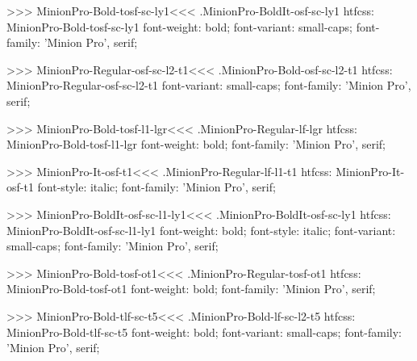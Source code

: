 {>>>
\<MinionPro-Bold-tosf-sc-ly1\><<<
.MinionPro-BoldIt-osf-sc-ly1
htfcss:  MinionPro-Bold-tosf-sc-ly1  font-weight: bold; font-variant: small-caps; font-family: 'Minion Pro', serif;

>>>
\<MinionPro-Regular-osf-sc-l2-t1\><<<
.MinionPro-Bold-osf-sc-l2-t1
htfcss:  MinionPro-Regular-osf-sc-l2-t1  font-variant: small-caps; font-family: 'Minion Pro', serif;

>>>
\<MinionPro-Bold-tosf-l1-lgr\><<<
.MinionPro-Regular-lf-lgr
htfcss:  MinionPro-Bold-tosf-l1-lgr  font-weight: bold; font-family: 'Minion Pro', serif;

>>>
\<MinionPro-It-osf-t1\><<<
.MinionPro-Regular-lf-l1-t1
htfcss:  MinionPro-It-osf-t1  font-style: italic; font-family: 'Minion Pro', serif;

>>>
\<MinionPro-BoldIt-osf-sc-l1-ly1\><<<
.MinionPro-BoldIt-osf-sc-ly1
htfcss:  MinionPro-BoldIt-osf-sc-l1-ly1  font-weight: bold; font-style: italic; font-variant: small-caps; font-family: 'Minion Pro', serif;

>>>
\<MinionPro-Bold-tosf-ot1\><<<
.MinionPro-Regular-tosf-ot1
htfcss:  MinionPro-Bold-tosf-ot1  font-weight: bold; font-family: 'Minion Pro', serif;

>>>
\<MinionPro-Bold-tlf-sc-t5\><<<
.MinionPro-Bold-lf-sc-l2-t5
htfcss:  MinionPro-Bold-tlf-sc-t5  font-weight: bold; font-variant: small-caps; font-family: 'Minion Pro', serif;

}
